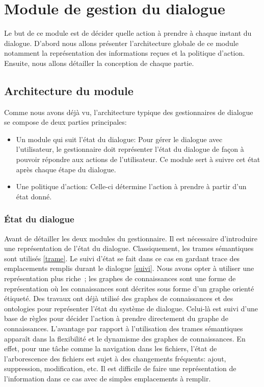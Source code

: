 \section{Module de gestion du dialogue}
Le but de ce module est de décider quelle action à prendre à chaque instant du dialogue. D'abord nous allons présenter l'architecture globale de ce module notamment la représentation des informations reçues et la politique d'action. Ensuite, nous allons détailler la conception de chaque partie.
\subsection{Architecture du module}
Comme nous avons déjà vu, l'architecture typique des gestionnaires de dialogue se compose de deux parties principales: 
\begin{itemize}
	\item Un module qui suit l'état du dialogue: Pour gérer le dialogue avec l'utilisateur, le gestionnaire doit représenter l'état du dialogue de façon à pouvoir répondre aux actions de l'utilisateur. Ce module sert à suivre cet état après chaque étape du dialogue.
	\item Une politique d'action: Celle-ci détermine l'action à prendre à partir d'un état donné.
\end{itemize}
\subsubsection{État du dialogue}
Avant de détailler les deux modules du gestionnaire. Il est nécessaire d'introduire une représentation de l'état du dialogue. Classiquement, les trames sémantiques sont utilisés \ref{trame}. Le suivi d'état se fait dans ce cas en gardant trace des emplacements remplis durant le dialogue \ref{suivi}.
Nous avons opter à utiliser une représentation plus riche ; les graphes de connaissances sont une forme de représentation où les connaissances sont décrites sous forme d'un graphe orienté étiqueté. Des travaux ont déjà utilisé des graphes de connaissances\cite{Stoyanchev2018} et des ontologies\cite{Wessel2019} pour représenter l'état du système de dialogue. Celui-là est suivi d'une base de règles pour décider l'action à prendre directement du graphe de connaissances. L'avantage par rapport à l'utilisation des trames sémantiques apparaît dans la flexibilité et le dynamisme des graphes de connaissances. En effet, pour une tâche comme la navigation dans les fichiers, l'état de l'arborescence des fichiers est sujet à des changements fréquents: ajout, suppression, modification, etc. Il est difficile de faire une représentation de l'information dans ce cas avec de simples emplacements à remplir.
